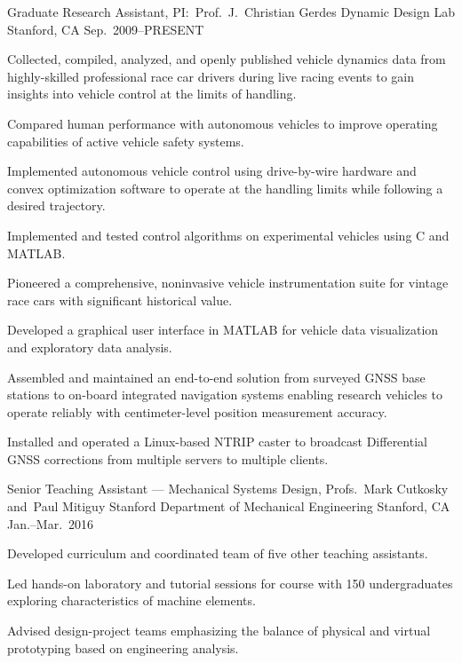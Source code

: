\begin{cventries}
  \cventry%
    {Graduate Research Assistant, PI:\ Prof.~J.~Christian Gerdes}
    {Dynamic Design Lab}
    {Stanford, CA}
    {Sep.\ 2009--PRESENT}
    {
      \begin{cvitems}
        \item{Collected, compiled, analyzed, and openly published vehicle dynamics data from highly-skilled professional race car drivers during live racing events to gain insights into vehicle control at the limits of handling.}
        \item{Compared human performance with autonomous vehicles to improve operating capabilities of active vehicle safety systems.}
        \item{Implemented autonomous vehicle control using drive-by-wire hardware and convex optimization software to operate at the handling limits while following a desired trajectory.}
        \item{Implemented and tested control algorithms on experimental vehicles using C and MATLAB\@.}
        \item{Pioneered a comprehensive, noninvasive vehicle instrumentation suite for vintage race cars with significant historical value.}
        \item{Developed a graphical user interface in MATLAB for vehicle data visualization and exploratory data analysis.}
        \item{Assembled and maintained an end-to-end solution from surveyed GNSS base stations to on-board integrated navigation systems enabling research vehicles to operate reliably with centimeter-level position measurement accuracy.}
        \item{Installed and operated a Linux-based NTRIP caster to broadcast Differential GNSS corrections from multiple servers to multiple clients.}
      \end{cvitems}
    }

  \cventry%
    {Senior Teaching Assistant --- Mechanical Systems Design, Profs.~Mark Cutkosky and~Paul Mitiguy}
    {Stanford Department of Mechanical Engineering}
    {Stanford, CA}
    {Jan.--Mar.\ 2016}
    {
      \begin{cvitems}
        \item{Developed curriculum and coordinated team of five other teaching assistants.}
        \item{Led hands-on laboratory and tutorial sessions for course with 150 undergraduates exploring characteristics of machine elements.}
        \item{Advised design-project teams emphasizing the balance of physical and virtual prototyping based on engineering analysis.}
      \end{cvitems}
    }


\end{cventries}
